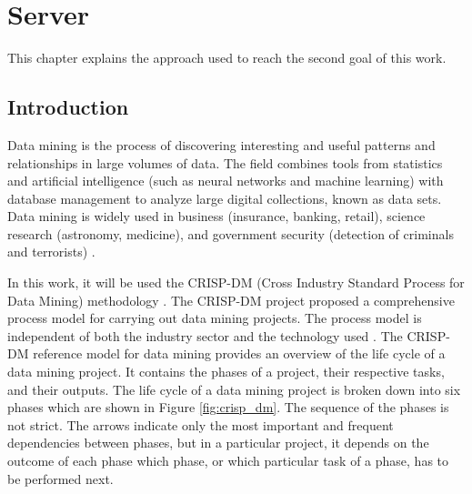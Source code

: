 % 
%  
%
\chapter{Server}
\label{cha:server}
This chapter explains the approach used to reach the second goal of this work. 

\section{Introduction} %
\label{sec:introduction}
Data mining is the process of discovering interesting and useful patterns and relationships in large volumes of data. The field combines tools from statistics and artificial intelligence (such as neural networks and machine learning) with database management to analyze large digital collections, known as data sets. Data mining is widely used in business (insurance, banking, retail), science research (astronomy, medicine), and government security (detection of criminals and terrorists) \cite{Okonkwo2011COMBATINGCA}. 

In this work, it will be used the CRISP-DM (Cross Industry Standard Process for Data Mining) methodology \cite{CRISPDM}.
The CRISP-DM project proposed a comprehensive process model for carrying out data mining projects. The process model is independent of both the industry sector and the technology used \cite{CRISPDM}. 
The CRISP-DM reference model for data mining provides an overview of the life cycle of a data
mining project. It contains the phases of a project, their respective tasks, and their outputs.
The life cycle of a data mining project is broken down into six phases which are shown in Figure \ref{fig:crisp_dm}.
The sequence of the phases is not strict. The arrows indicate only the most important and frequent
dependencies between phases, but in a particular project, it depends on the outcome of each phase
which phase, or which particular task of a phase, has to be performed next.

